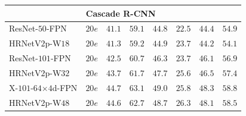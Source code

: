 \documentclass[10pt,journal,compsoc]{IEEEtran}
\begin{document}
\begin{table}[t]
\begin{tabular}{l|c|ccc|ccc}
	    \hline
	    
	    \multicolumn{8}{c}{Cascade R-CNN~\cite{CaiV19}}\\
	    \hline
	    ResNet-$50$-FPN & $20e$ & $41.1$ & $59.1$ & $44.8$ & $22.5$ & ${44.4}$ & ${54.9}$ \\ 
	    HRNetV$2$p-W$18$ & $20e$ & ${41.3}$ & ${59.2}$ & ${44.9}$ & ${23.7}$ & $44.2$ & $54.1$ \\ 
	    \hline
	    ResNet-$101$-FPN & $20e$ & $42.5$ & $60.7$ & $46.3$ & $23.7$ & $46.1$ & $56.9$ \\ 
	    HRNetV$2$p-W$32$ & $20e$ & ${43.7}$ & ${61.7}$ & ${47.7}$ & ${25.6}$ & ${46.5}$ & ${57.4}$ \\ 
	    \hline
	     X-$101$-$64$$\times$$4$d-FPN & $20e$ & ${44.7}$ & ${63.1}$ & ${49.0}$ & $25.8$ & ${48.3}$ & ${58.8}$ \\
	    HRNetV$2$p-W$48$ & $20e$ & $44.6$ & $62.7$ & $48.7$ & ${26.3}$ & $48.1$ & $58.5$  \\
	    \hline
	\end{tabular} 
	\vspace{-.2cm}
	\end{table}
\end{document}
